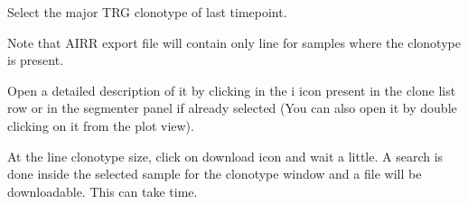 Select the major TRG clonotype of last timepoint.

Note that AIRR export file will contain only line for samples where the clonotype is present.



Open a detailed description of it by clicking in the {i icon} present in the clone list row or in the segmenter panel if already selected (You can also open it by double clicking on it from the plot view).

At the line clonotype size, click on download icon and wait a little. 
A search is done inside the selected sample for the clonotype window and a file will be downloadable. 
This can take time. 
